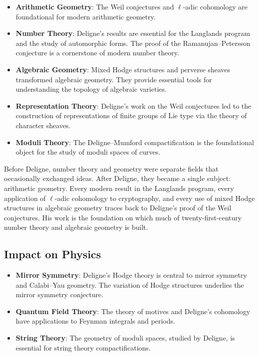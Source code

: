 \begin{itemize}
\item \textbf{Arithmetic Geometry}: The Weil conjectures and $\ell$-adic cohomology are foundational for modern arithmetic geometry.
\item \textbf{Number Theory}: Deligne's results are essential for the Langlands program and the study of automorphic forms. The proof of the Ramanujan--Petersson conjecture is a cornerstone of modern number theory.
\item \textbf{Algebraic Geometry}: Mixed Hodge structures and perverse sheaves transformed algebraic geometry. They provide essential tools for understanding the topology of algebraic varieties.
\item \textbf{Representation Theory}: Deligne's work on the Weil conjectures led to the construction of representations of finite groups of Lie type via the theory of character sheaves.
\item \textbf{Moduli Theory}: The Deligne--Mumford compactification is the foundational object for the study of moduli spaces of curves.
\end{itemize}

\begin{whyitmatters}
Before Deligne, number theory and geometry were separate fields that occasionally exchanged ideas. After Deligne, they became a single subject: arithmetic geometry. Every modern result in the Langlands program, every application of $\ell$-adic cohomology to cryptography, and every use of mixed Hodge structures in algebraic geometry traces back to Deligne's proof of the Weil conjectures. His work is the foundation on which much of twenty-first-century number theory and algebraic geometry is built.
\end{whyitmatters}

\subsection{Impact on Physics}

\begin{itemize}
\item \textbf{Mirror Symmetry}: Deligne's Hodge theory is central to mirror symmetry and Calabi--Yau geometry. The variation of Hodge structures underlies the mirror symmetry conjecture.
\item \textbf{Quantum Field Theory}: The theory of motives and Deligne's cohomology have applications to Feynman integrals and periods.
\item \textbf{String Theory}: The geometry of moduli spaces, studied by Deligne, is essential for string theory compactifications.
\end{itemize}

